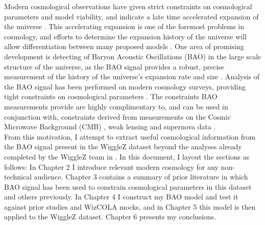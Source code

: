 \documentclass[titlesmallcaps, examinerscopy, copyrightpage]{uqthesis}
\begin{document}
Modern cosmological observations have given strict constraints on cosmological parameters and model viability, and indicate a late time accelerated expansion of the universe \citep{RiessFilippenko1998, PerlmutterAldering1999, SpergelVerde2003, RiessStrolger2004, TegmarkBlanton2004, SanchezBaugh2006, SpergelBean2007, Komatsu2009, RiessMacri2009, PercivalReid2010, ReidPercival2010,BlakeKazin2011}. This accelerating expansion is one of the foremost problems in cosmology, and efforts to determine the expansion history of the universe will allow differentiation between many proposed models \citep{SanchezScoccola2012, AlbrechtBernstein2006}. One area of promising development is detecting of Baryon Acoustic Oscillations (BAO) in the large scale structure of the universe, as the BAO signal provides a robust, precise measurement of the history of the universe's expansion rate and size \citep{BlakeGlazebrook2003,HuHaiman2003,Linder2003,SeoEisenstein2003}. Analysis of the BAO signal has been performed on modern cosmology surveys, providing tight constraints on cosmological parameters \citep{Gaztanaga2009, SanchezKazinBeutler2013, AndersonAubourg2014}. The constraints BAO measurements provide are highly complimentary to, and can be used in conjunction with, constraints derived from measurements on the Cosmic Microwave Background (CMB) \citep{BennettHalpern2003, Planck201416}, weak lensing \citep{VanWaerbeke2000,WittmanTyson2000,KaiserWilson2000} and supernova data \citep{KowalskiRubin2008, KesslerBeckerCinabro2009, BetouleKessler2014}.\\

From this motivation, I attempt to extract useful cosmological information from the BAO signal present in the WiggleZ dataset \citep[WiggleZ;][]{Drinkwater2010} beyond the analyses already completed by the WiggleZ team in \citet{BlakeDavis2011, BlakeKazin2011, BlakeBroughColless2011, BlakeGlazebrook2011, Parkinson2012}. In this document, I layout the sections as follows: In Chapter 2 I introduce relevant modern cosmology for any non-technical audience. Chapter 3 contains a summary of prior literature in which BAO signal has been used to constrain cosmological parameters in this dataset and others previously. In Chapter 4 I construct my BAO model and test it against prior studies and WizCOLA mocks, and in Chapter 5 this model is then applied to the WiggleZ dataset. Chapter 6 presents my conclusions.
\end{document}
